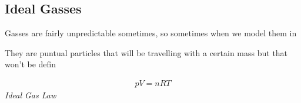 \documentclass[11pt,fleqn]{book} %
\begin{document}
\section{Ideal Gasses}

Gasses are fairly unpredictable sometimes, so sometimes when we model them in 

They are puntual particles that will be travelling with a certain mass but that won't be defin

\begin{center}
    \begin{gather}
        pV = nRT
    \end{gather}
    \textit{Ideal Gas Law}
\end{center}



\chapter{}


\printbibliography
\end{document}

